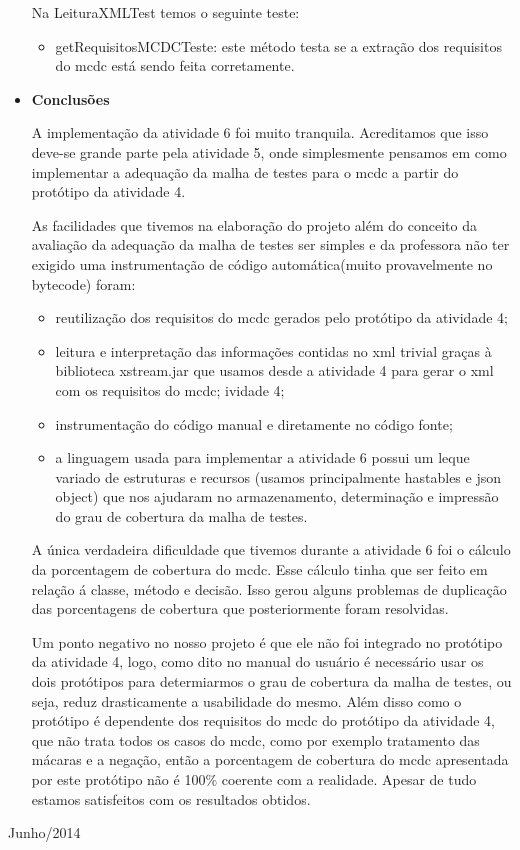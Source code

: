 \documentclass[a4paper,11pt]{article}
\newcommand{\sepitem}{\vspace{0.1in}\item}
\begin{document}
\begin{itemize}
Na LeituraXMLTest temos o seguinte teste:
\begin{itemize}
\item getRequisitosMCDCTeste: este método testa se a extração dos requisitos do mcdc está sendo feita corretamente. 
\end{itemize}

\sepitem \textbf{Conclusões}
\setlength{\parindent}{5ex}

A implementação da atividade 6 foi muito tranquila. Acreditamos que isso deve-se grande parte pela atividade 5, onde 
simplesmente pensamos em como implementar a adequação da malha de testes para o mcdc a partir do protótipo da atividade 4.

As facilidades que tivemos na elaboração do projeto além do conceito da avaliação da adequação da malha de testes
ser simples e da professora não ter exigido uma instrumentação de código automática(muito provavelmente no bytecode)
foram:

\begin{itemize}
\item reutilização dos requisitos do mcdc gerados pelo protótipo da atividade 4;
\item leitura e interpretação das informações contidas no xml trivial graças à biblioteca xstream.jar que usamos 
desde a atividade 4 para gerar o xml com os requisitos do mcdc;
ividade 4;
\item instrumentação do código manual e diretamente no código fonte;
\item a linguagem usada para implementar a atividade 6 possui um leque variado de estruturas e recursos (usamos principalmente 
hastables e  json object) que nos ajudaram no armazenamento, determinação e impressão do grau de cobertura da malha de testes.
\end{itemize}

A única verdadeira dificuldade que tivemos durante a atividade 6 foi o cálculo da porcentagem de cobertura do mcdc. Esse cálculo 
tinha que ser feito em relação á classe, método e decisão. Isso gerou alguns problemas de duplicação das porcentagens de cobertura
que posteriormente foram resolvidas.

Um ponto negativo no nosso projeto é que ele não foi integrado no protótipo da atividade 4, logo, como dito no manual do usuário 
é necessário usar os dois protótipos para determiarmos o grau de cobertura da malha de testes, ou seja, reduz drasticamente a
usabilidade do mesmo. Além disso como o protótipo é dependente dos requisitos do mcdc do protótipo da atividade 4, que não trata 
todos os casos do mcdc, como por exemplo tratamento das mácaras e a negação, então a porcentagem de cobertura do mcdc apresentada por este 
protótipo não é 100\% coerente com a realidade. Apesar de tudo estamos satisfeitos com os resultados obtidos. 

\end{itemize}

\vfill

\raggedleft
{\sc Junho/2014}
\end{document}

